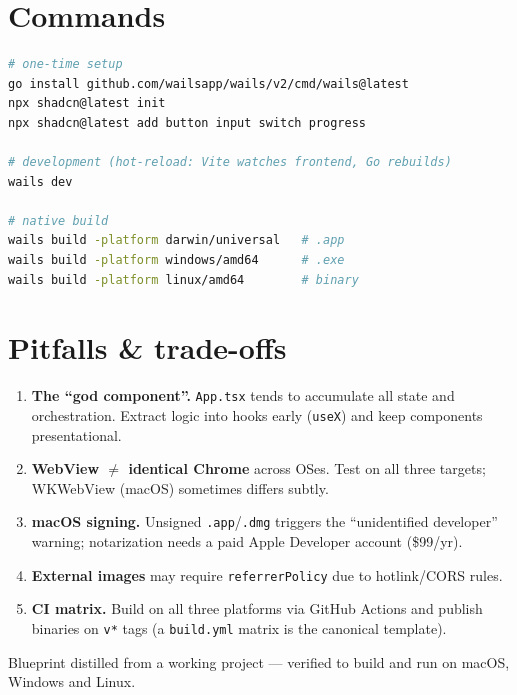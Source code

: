 \documentclass[11pt,a4paper]{article}
\begin{document}
\section{Commands}

\begin{lstlisting}[language=bash]
# one-time setup
go install github.com/wailsapp/wails/v2/cmd/wails@latest
npx shadcn@latest init
npx shadcn@latest add button input switch progress

# development (hot-reload: Vite watches frontend, Go rebuilds)
wails dev

# native build
wails build -platform darwin/universal   # .app
wails build -platform windows/amd64      # .exe
wails build -platform linux/amd64        # binary
\end{lstlisting}

\section{Pitfalls \& trade-offs}

\begin{enumerate}[leftmargin=1.4em,itemsep=3pt]
  \item \textbf{The ``god component''.} \texttt{App.tsx} tends to accumulate all
        state and orchestration. Extract logic into hooks early
        (\texttt{useX}) and keep components presentational.
  \item \textbf{WebView $\neq$ identical Chrome} across OSes. Test on all three
        targets; WKWebView (macOS) sometimes differs subtly.
  \item \textbf{macOS signing.} Unsigned \texttt{.app}/\texttt{.dmg} triggers the
        ``unidentified developer'' warning; notarization needs a paid Apple
        Developer account (\$99/yr).
  \item \textbf{External images} may require \texttt{referrerPolicy} due to
        hotlink/CORS rules.
  \item \textbf{CI matrix.} Build on all three platforms via GitHub Actions and
        publish binaries on \texttt{v*} tags (a \texttt{build.yml} matrix is the
        canonical template).
\end{enumerate}

\vfill
\begin{center}\small\color{muted}
Blueprint distilled from a working project --- verified to build and run on macOS,
Windows and Linux.
\end{center}
\end{document}
